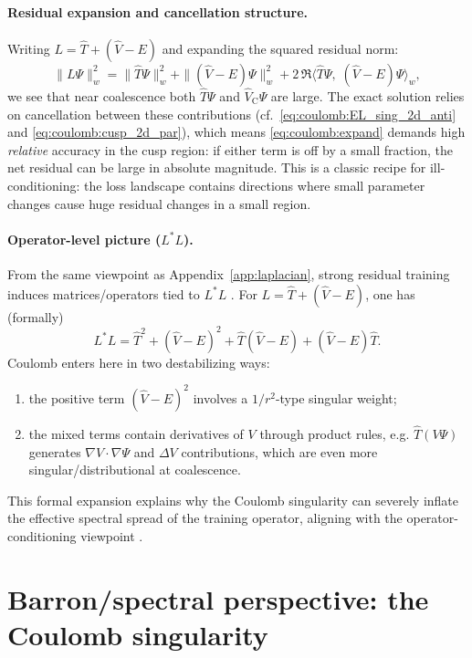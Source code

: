 \paragraph{Residual expansion and cancellation structure.}
Writing $L=\hat T+(\hat V-E)$ and expanding the squared residual norm:
\begin{equation}
\|L\Psi\|_w^2
=
\|\hat T\Psi\|_w^2 + \|(\hat V-E)\Psi\|_w^2
+2\,\Re\langle \hat T\Psi,\;(\hat V-E)\Psi\rangle_w,
\label{eq:coulomb:expand}
\end{equation}
we see that near coalescence both $\hat T\Psi$ and $\hat V_{\mathrm C}\Psi$ are large.
The exact solution relies on cancellation between these contributions
(cf.\ \eqref{eq:coulomb:EL_sing_2d_anti} and \eqref{eq:coulomb:cusp_2d_par}), which means
\eqref{eq:coulomb:expand} demands high \emph{relative} accuracy in the cusp region:
if either term is off by a small fraction, the net residual can be large in absolute magnitude.
This is a classic recipe for ill-conditioning: the loss landscape contains directions
where small parameter changes cause huge residual changes in a small region.

\paragraph{Operator-level picture (\(L^\ast L\)).}
From the same viewpoint as Appendix~\ref{app:laplacian}, strong residual training
induces matrices/operators tied to $L^\ast L$ \cite{De_Ryck_2024}.
For $L=\hat T+(\hat V-E)$, one has (formally)
\begin{equation}
L^\ast L
=
\hat T^2 + (\hat V-E)^2 + \hat T(\hat V-E) + (\hat V-E)\hat T.
\label{eq:coulomb:LstarL}
\end{equation}
Coulomb enters here in two destabilizing ways:
\begin{enumerate}
\item the positive term $(\hat V-E)^2$ involves a $1/r^2$-type singular weight;
\item the mixed terms contain derivatives of $V$ through product rules, e.g.
$\hat T(V\Psi)$ generates $\nabla V\cdot\nabla\Psi$ and $\Delta V$ contributions,
which are even more singular/distributional at coalescence.
\end{enumerate}
This formal expansion explains why the Coulomb singularity can severely inflate
the effective spectral spread of the training operator, aligning with the
operator-conditioning viewpoint \cite{De_Ryck_2024}.

\section{Barron/spectral perspective: the Coulomb singularity}
\label{app:coulomb:barron}

